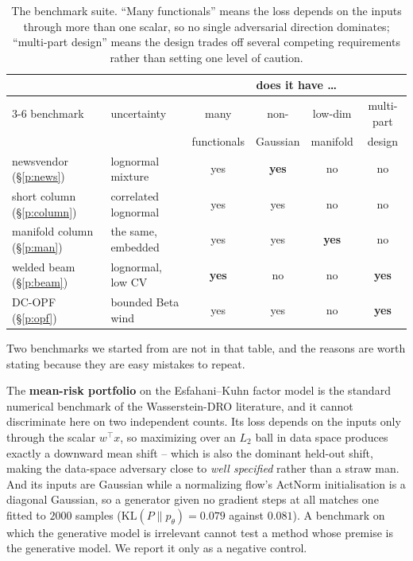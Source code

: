 \documentclass[11pt]{article}
\begin{document}
\begin{table}[h]
\centering
\small
\begin{tabular}{llcccc}
\toprule
 & & \multicolumn{4}{c}{does it have \dots} \\
\cmidrule(l){3-6}
benchmark & uncertainty & many & non- & low-dim & multi-part \\
 & & functionals & Gaussian & manifold & design \\
\midrule
newsvendor (\S\ref{p:news})       & lognormal mixture & yes & \textbf{yes} & no & no \\
short column (\S\ref{p:column})   & correlated lognormal & yes & yes & no & no \\
manifold column (\S\ref{p:man})   & the same, embedded & yes & yes & \textbf{yes} & no \\
welded beam (\S\ref{p:beam})      & lognormal, low CV & \textbf{yes} & no & no & \textbf{yes} \\
DC-OPF (\S\ref{p:opf})            & bounded Beta wind & yes & yes & no & \textbf{yes} \\
\bottomrule
\end{tabular}
\caption{The benchmark suite. ``Many functionals'' means the loss depends on the inputs
through more than one scalar, so no single adversarial direction dominates; ``multi-part
design'' means the design trades off several competing requirements rather than setting one
level of caution.}
\label{tab:benchmarks}
\end{table}

Two benchmarks we started from are not in that table, and the reasons are worth stating
because they are easy mistakes to repeat.

The \textbf{mean-risk portfolio} on the Esfahani--Kuhn factor model is the standard
numerical benchmark of the Wasserstein-DRO literature, and it cannot discriminate here on
two independent counts. Its loss depends on the inputs only through the scalar $w^\top x$,
so maximizing over an $L_2$ ball in data space produces exactly a downward mean shift --
which is also the dominant held-out shift, making the data-space adversary close to
\emph{well specified} rather than a straw man. And its inputs are Gaussian while a
normalizing flow's ActNorm initialisation is a diagonal Gaussian, so a generator given no
gradient steps at all matches one fitted to $2000$ samples
($\mathrm{KL}(P\|p_\theta) = 0.079$ against $0.081$). A benchmark on which the generative
model is irrelevant cannot test a method whose premise is the generative model. We report
it only as a negative control.
\end{document}
